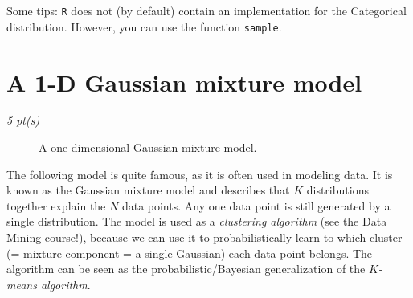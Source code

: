 \documentclass[a4paper]{article}
\newcommand{\score}[1]{ \noindent \emph{#1 pt(s)}\\}
\renewcommand{\v}[1]{\mathbf{\bm #1}}
\begin{document}
Some tips: \texttt{R} does not (by default) contain an implementation for the Categorical distribution. However, you can use the function \texttt{sample}.


\section{A 1-D Gaussian mixture model}
\score{5}

\begin{figure}[t]
    \centering
    \caption{A one-dimensional Gaussian mixture model.}
    \label{fig:gmm}
\end{figure}


The following model is quite famous, as it is often used in modeling data. It is known as the Gaussian mixture model and describes that $K$ distributions together explain the $N$ data points. Any one data point is still generated by a single distribution. The model is used as a \emph{clustering algorithm} (see the Data Mining course!), because we can use it to probabilistically learn to which cluster (= mixture component = a single Gaussian) each data point belongs. The algorithm can be seen as the probabilistic/Bayesian generalization of the \emph{$K$-means algorithm}.
\end{document}
